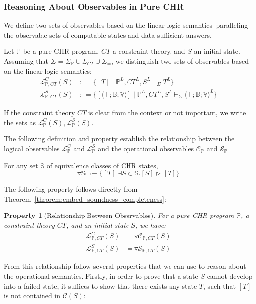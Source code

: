 \documentclass[acmtocl]{acmtrans2m}
\newtheorem{property}[theorem]{Property}
\newcommand\state[1]{\langle #1 \rangle}
\newcommand\ent{\rhd}
\newcommand{\bbP}{\ensuremath{\mathbb{P}}}
\newcommand{\bbS}{\ensuremath{\mathbb{S}}}
\newcommand{\B}{\ensuremath{\mathbb{B}}}
\newcommand{\V}{\ensuremath{\mathbb{V}}}
\newcommand{\cS}{\ensuremath{\mathcal{S}}}
\newcommand{\cC}{\ensuremath{\mathcal{C}}}
\newcommand{\bcS}{\ensuremath{\bar{\mathcal{S}}}}
\newcommand{\cL}{\mathcal{L}}
\newcommand{\Sct}{\ensuremath{\Sigma_{CT}}}
\newcommand{\Seq}{\ensuremath{\Sigma_{\doteq}}}
\newcommand{\Sp}{\ensuremath{\Sigma_\mathbb{P}}}
\begin{document}
\subsubsection{Reasoning About Observables in Pure CHR}

We define two sets of observables based on the linear logic
semantics, paralleling the observable sets of computable states and
data-sufficient answers.

\begin{definition}
Let $\bbP$ be a pure CHR program, $CT$ a constraint theory, and $S$
an initial state. Assuming that $\Sigma=\Sp\cup\Sct\cup\Seq$, we distinguish
two sets of observables based on the linear logic semantics:
\begin{align*}
\cL_{\bbP,CT}^C(S) &
	::= \{[T]\mid \bbP^L,CT^L,S^L\vdash_\Sigma T^L\} \\
\cL_{\bbP,CT}^S(S) &
	::= \{[\state{\top;\B;\V}]\mid \bbP^L,CT^L,S^L\vdash_\Sigma	\state{\top;\B;\V}^L\}
\end{align*}

If the constraint theory $CT$ is clear from
the context or not important, we write the sets as $\cL_{\bbP}^C(S),
\cL_{\bbP}^S(S)$.

\end{definition}

The following definition and property establish the relationship between the
logical observables $\cL_{\bbP}^C$ and $\cL_{\bbP}^S$ and the operational
observables $\cC_{\bbP}$ and $\bcS_{\bbP}$

\begin{definition}[Lower Closure of $\ent$]
For any set $\bbS$ of equivalence classes of CHR states,
\[
	\triangledown\bbS ::= \{[T]|\exists S\in\bbS.[S]\ent[T]\}
\]
\end{definition}

The following property follows directly from
Theorem~\ref{theorem:embed_soundness_completeness}:

\begin{property}[Relationship Between Observables]
For a pure CHR program $\bbP$, a constraint theory $CT$, and an initial
state $S$, we have:
\begin{align*}
	\cL_{\bbP,CT}^C(S) & = \triangledown\cC_{\bbP,CT}(S) \\
	\cL_{\bbP,CT}^S(S) & = \triangledown\cS_{\bbP,CT}(S)
\end{align*}
\end{property}

From this relationship follow several properties that we can use to reason about
the operational semantics. Firstly, in order to prove that a state $S$ cannot
develop into a failed state, it suffices to show that there exists any state $T$,
such that $[T]$ is not contained in $\cC(S)$:
\end{document}
